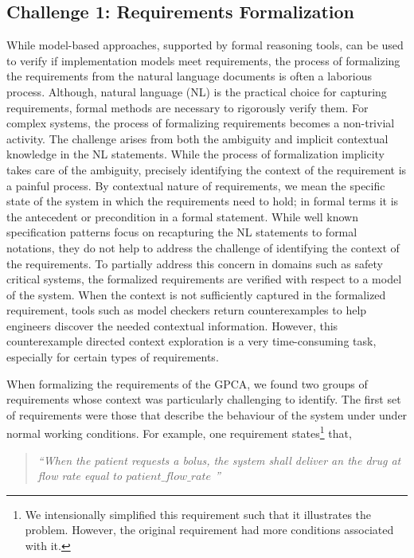 \subsection{Challenge 1: Requirements Formalization}

While model-based approaches, supported by formal reasoning tools, can be used to verify if implementation models meet requirements, the process of formalizing the requirements from the natural language documents is often a laborious process. Although, natural language (NL) is the practical choice for capturing requirements, formal methods are necessary to rigorously verify them. For complex systems, the process of formalizing requirements becomes a non-trivial activity. The challenge arises from both the ambiguity and implicit contextual knowledge in the NL statements. While the process of formalization implicity takes care of the ambiguity, precisely identifying the context of the requirement is a painful process. By contextual nature of requirements, we mean the specific state of the system in which the requirements need to hold; in formal terms it is the antecedent or precondition in a formal statement. While well known specification patterns focus on recapturing the NL statements to formal notations, they do not help to address the challenge of identifying the context of the requirements. To partially address this concern in domains such as safety critical systems, the formalized requirements are verified with respect to a model of the system. When the context is not sufficiently captured in the formalized requirement, tools such as model checkers return counterexamples to help engineers discover the needed contextual information. However, this counterexample directed context exploration is a very time-consuming task, especially for certain types of requirements.

When formalizing the requirements of the GPCA, we found two groups of requirements whose context was particularly challenging to identify. The first set of requirements were those that describe the behaviour of the system under under normal working conditions. For example, one requirement states\footnote{\scriptsize{We intensionally simplified this requirement such that it illustrates the problem. However, the original requirement had more conditions associated with it.}} that,

\begin{quotation}
\emph{``When the patient requests a bolus, the system shall deliver an the drug at flow rate equal to $patient\_flow\_rate$ ''}
\end{quotation}

